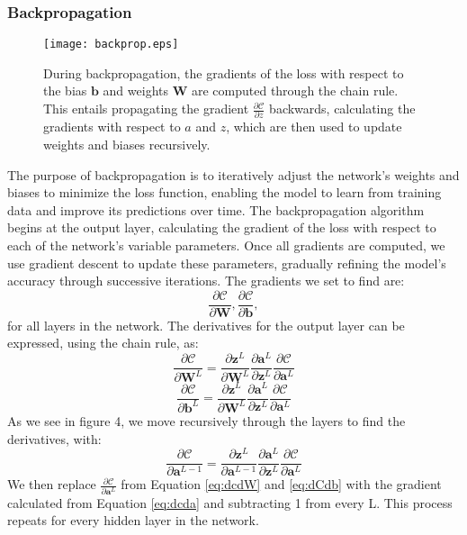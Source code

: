 \documentclass{article}
\begin{document}
\begin{multicols}{2}
\subsubsection*{Backpropagation}
\begin{figure}[H]
    \centering
    \texttt{[image: backprop.eps]} 
    \caption{During backpropagation, the gradients of the loss with respect to the bias $\bm{b}$ and weights $\mathbf{W}$ are computed through the chain rule. This entails propagating the gradient $\frac{\partial \mathcal{C}}{\partial z}$ backwards, calculating the gradients with respect to  $a$ and $z$, which are then used to update weights and biases recursively. \cite{3blue1brown_backpropagation_2017}} 
    \label{fig:backprop_fig}
\end{figure}
The purpose of backpropagation is to iteratively adjust the network's weights and biases to minimize the loss function, enabling the model to learn from training data and improve its predictions over time. The backpropagation algorithm begins at the output layer, calculating the gradient of the loss with respect to each of the network's variable parameters. Once all gradients are computed, we use gradient descent to update these parameters, gradually refining the model's accuracy through successive iterations. The gradients we set to find are:
$$\frac{\partial \mathcal{C}}{\partial \mathbf{W}}, \frac{\partial \mathcal{C}}{\partial \bm{b}}, $$
for all layers in the network. The derivatives for the output layer can be expressed, using the chain rule, as:
\begin{equation}\label{eq:dcdW}
    \frac{\partial \mathcal{C}}{\partial \mathbf{W}^L} = \frac{\partial \bm{z}^L}{\partial \mathbf{W}^L} 
    \frac{\partial \bm{a}^L}{\partial \bm{z}^L}
    \frac{\partial \mathcal{C}}{\partial \bm{a}^L}
\end{equation}
\begin{equation}\label{eq:dCdb}
    \frac{\partial \mathcal{C}}{\partial \mathbf{b}^L} = \frac{\partial \bm{z}^L}{\partial \mathbf{W}^L} 
    \frac{\partial \bm{a}^L}{\partial \bm{z}^L}
    \frac{\partial \mathcal{C}}{\partial \bm{a}^L}
\end{equation}
As we see in figure 4, we move recursively through the layers to find the derivatives, with: 
\begin{equation}\label{eq:dcda}
\frac{\partial \mathcal{C}}{\partial \bm{a}^{L-1}} = \frac{\partial \bm{z}^L}{\partial \bm{a}^{L-1}} 
    \frac{\partial \bm{a}^L}{\partial \bm{z}^L}
    \frac{\partial \mathcal{C}}{\partial \bm{a}^L}    
\end{equation}
We then replace $\frac{\partial \mathcal{C}}{\partial \bm{a}^L}$ from Equation \ref{eq:dcdW} and \ref{eq:dCdb} with the gradient calculated from Equation \ref{eq:dcda} and subtracting 1 from every L. This process repeats for every hidden layer in the network.


\end{multicols}
\end{document}
